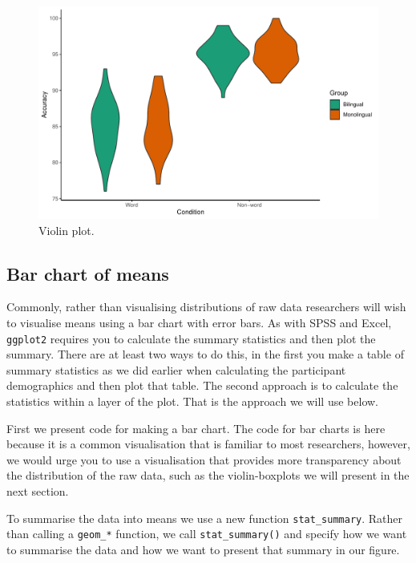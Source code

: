 \documentclass[
  english,
  doc,floatsintext]{apa6}
\begin{document}
\begin{figure}

{\centering \includegraphics[width=1\linewidth]{images/violin1-1} 

}

\caption{Violin plot.}\label{fig:violin1}
\end{figure}

\hypertarget{bar-chart-of-means}{%
\subsection{Bar chart of means}\label{bar-chart-of-means}}

Commonly, rather than visualising distributions of raw data researchers will wish to visualise means using a bar chart with error bars. As with SPSS and Excel, \texttt{ggplot2} requires you to calculate the summary statistics and then plot the summary. There are at least two ways to do this, in the first you make a table of summary statistics as we did earlier when calculating the participant demographics and then plot that table. The second approach is to calculate the statistics within a layer of the plot. That is the approach we will use below.

First we present code for making a bar chart. The code for bar charts is here because it is a common visualisation that is familiar to most researchers, however, we would urge you to use a visualisation that provides more transparency about the distribution of the raw data, such as the violin-boxplots we will present in the next section.

To summarise the data into means we use a new function \texttt{stat\_summary}. Rather than calling a \texttt{geom\_*} function, we call \texttt{stat\_summary()} and specify how we want to summarise the data and how we want to present that summary in our figure.
\end{document}
